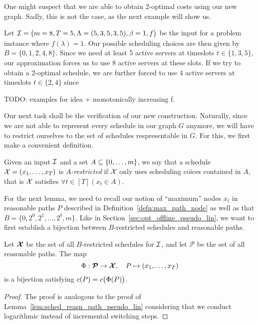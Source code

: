 One might suspect that we are able to obtain 2-optimal costs using our new graph. Sadly, this is not the case, as the next example will show us.
\begin{exmpl}
Let $\mathcal{I}=\bigl(m=8,T=5,\Lambda=(5,3,5,3,5),\beta=1,f\bigr)$ be the input for a problem instance where $f(\lambda)=1$. Our possible scheduling choices are then given by $B=\{0,1,2,4,8\}$. Since we need at least 5 active servers at timeslots $t\in\{1,3,5\}$, our approximation forces us to use 8 active servers at these slots. If we try to obtain a 2-optimal schedule, we are further forced to use 4 active servers at timeslots $t\in\{2,4\}$ since 
\end{exmpl}

TODO: examples for idea + monotonically increasing f.

Our next task shall be the verification of our new construction. Naturally, since we are not able to represent every schedule in our graph $G$ anymore, we will have to restrict ourselves to the set of schedules respresentable in $G$. For this, we first make a convenient definition.
\begin{defn}
Given an input $\mathcal{I}$ and a set $A\subseteq\{0,\ldots,m\}$, we say that a schedule $\mathcal{X}=(x_1,\ldots,x_T)$ is \textit{$A$-restricted} if $\mathcal{X}$ only uses scheduling coices contained in $A$, that is $\mathcal{X}$ satisfies $\forall t\in[T](x_t\in A)$.
\end{defn}
For the next lemma, we need to recall our notion of ``maximum'' nodes $x_t$ in reasonable paths $P$ described in Definition~\ref{defn:max_path_node} as well as that $B=\{0,2^0,2^1,\ldots,2^b,m\}$. Like in Section~\ref{sec:opt_offline_pseudo_lin}, we want to first establish a bijection between $B$-restricted schedules and reasonable paths.
\begin{lem}\label{lem:sched_reasn_path_approx_3}
Let $\bm{\mathcal{X}}$ be the set of all $B$-restricted schedules for $\mathcal{I}$, and let $\bm{\mathcal{P}}$ be the set of all reasonable paths. The map
\begin{equation*}
	\Phi:\bm{\mathcal{P}}\rightarrow\bm{\mathcal{X}},\quad P\mapsto (x_1,\ldots,x_T)
\end{equation*}
is a bijection satisfying $c(P)=c\bigl(\Phi(P)\bigr)$.
\end{lem}
\begin{proof}
The proof is analogous to the proof of Lemma~\ref{lem:sched_reasn_path_pseudo_lin} considering that we conduct logarithmic instead of incremental switching steps.
\end{proof}
